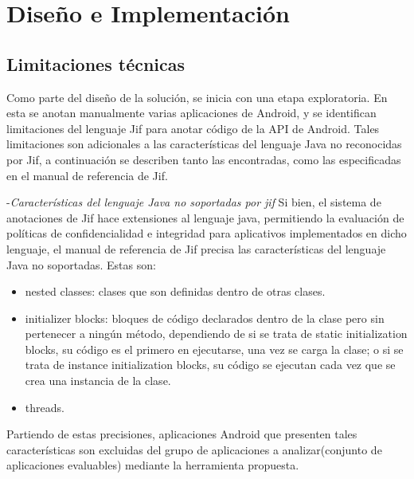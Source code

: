 \label{ch:desing}
\chapter{Diseño e Implementación}

\section{Limitaciones técnicas}
\label{sec:limitaciones}
Como parte del diseño de la solución, se inicia con una etapa exploratoria. En
esta se anotan manualmente varias aplicaciones de Android, y se identifican
limitaciones del lenguaje Jif para anotar código de la API de Android.
Tales limitaciones son adicionales a las características del lenguaje Java no
reconocidas por Jif, a continuación se describen tanto las encontradas, como las
especificadas en el manual de referencia de Jif.

-\textit{Características del lenguaje Java no soportadas por jif}\newline
Si bien, el sistema de anotaciones de Jif hace extensiones al lenguaje java,
permitiendo la evaluación de políticas de confidencialidad e integridad para
aplicativos implementados en dicho lenguaje, el manual de referencia de Jif
precisa las características del lenguaje Java no soportadas\cite{jifRef}. Estas
son:
\begin{itemize}
  \item nested classes: clases que son definidas dentro de otras clases.
  \item initializer blocks: bloques de código declarados dentro de la clase pero
  sin pertenecer a ningún método, dependiendo de si se trata de static
  initialization blocks, su código es el primero en ejecutarse, una vez se
  carga la clase; o si se trata de instance initialization blocks, su código se
  ejecutan cada vez que se crea una instancia de la clase.
\item threads.
\end{itemize} 
Partiendo de estas precisiones, aplicaciones Android que presenten tales
características son excluidas del grupo de aplicaciones a analizar(conjunto de
aplicaciones evaluables) mediante la herramienta propuesta.


